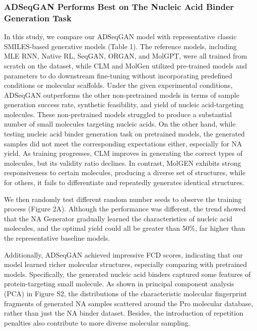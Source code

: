 \documentclass[10pt, twocolumn]{article}
\begin{document}
\subsubsection*{ADSeqGAN Performs Best on The Nucleic Acid Binder Generation Task}

In this study, we compare our ADSeqGAN model with representative classic SMILES-based generative models (Table 1). The reference models, including MLE RNN, Native RL, SeqGAN, ORGAN, and MolGPT, were all trained from scratch on the dataset, while CLM and MolGen utilized pre-trained models and parameters to do downstream fine-tuning without incorporating predefined conditions or molecular scaffolds. Under the given experimental conditions, ADSeqGAN outperforms the other non-pretrained models in terms of sample generation success rate, synthetic feasibility, and yield of nucleic acid-targeting molecules. These non-pretrained models struggled to produce a substantial number of small molecules targeting nucleic acids. On the other hand, while testing nucleic acid binder generation task on pretrained models, the generated samples did not meet the corresponding expectations either, especially for NA yield. As training progresses, CLM improves in generating the correct types of molecules, but its validity ratio declines. In contrast, MolGEN exhibits strong responsiveness to certain molecules, producing a diverse set of structures, while for others, it fails to differentiate and repeatedly generates identical structures. 

We then randomly test different random number seeds to observe the training process (Figure 2A). Although the performance was different, the trend showed that the NA Generator gradually learned the characteristics of nucleic acid molecules, and the optimal yield could all be greater than 50\%, far higher than the representative baseline models.  

Additionally, ADSeqGAN achieved impressive FCD scores, indicating that our model learned richer molecular structures, especially comparing with pretrained models. Specifically, the generated nucleic acid binders captured some features of protein-targeting small molecule. As shown in principal component analysis (PCA) in Figure S2, the distributions of the characteristic molecular fingerprint fragments of generated NA samples scattered around the Pro molecular database, rather than just the NA binder dataset. Besides, the introduction of repetition penalties also contribute to more diverse molecular sampling. 
\end{document}
